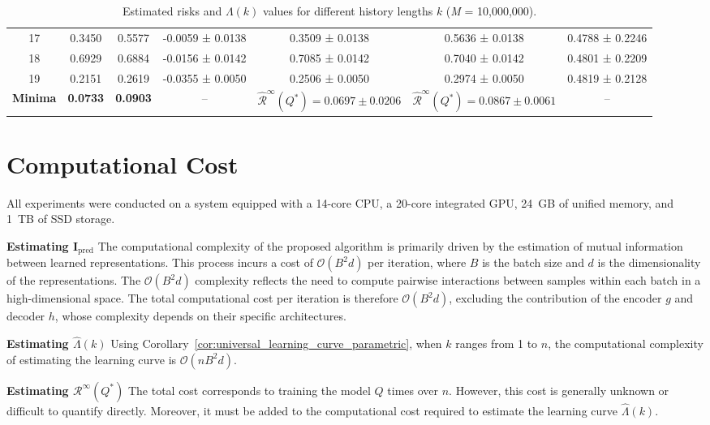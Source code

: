 \documentclass{article}
\begin{document}
\begin{table}[H]
{\begin{tabular}{c c c c c c c}
17 & 0.3450 & 0.5577 & -0.0059 ± 0.0138 & 0.3509 ± 0.0138 & 0.5636 ± 0.0138 & 0.4788 ± 0.2246 \\
18 & 0.6929 & 0.6884 & -0.0156 ± 0.0142 & 0.7085 ± 0.0142 & 0.7040 ± 0.0142 & 0.4801 ± 0.2209 \\
19 & 0.2151 & 0.2619 & -0.0355 ± 0.0050 & 0.2506 ± 0.0050 & 0.2974 ± 0.0050 & 0.4819 ± 0.2128 \\
\midrule
\multicolumn{1}{r}{\textbf{Minima}} &
\textbf{0.0733} &
\textbf{0.0903} &
-- &
$\hat{\mathcal{R}}^\infty(Q^*) = 0.0697 \pm 0.0206$ &
$\hat{\mathcal{R}}^\infty(Q^*) = 0.0867 \pm 0.0061$ &
-- \\
\bottomrule
\end{tabular}
}
\caption{Estimated risks and $\Lambda(k)$ values for different history lengths $k$ (\textit{M} = 10,000,000).}
\label{tab:universal_learning_4}
\end{table}





\section{Computational Cost}
\label{sec:cost}
All experiments were conducted on a system equipped with a 14-core CPU, a 20-core integrated GPU, 24~GB of unified memory, and 1~TB of SSD storage. 

\textbf{Estimating $\mathbf{I}_{\text{pred}}$} The computational complexity of the proposed algorithm is primarily driven by the estimation of mutual information between learned representations. This process incurs a cost of $\mathcal{O}(B^2 d)$ per iteration, where $B$ is the batch size and $d$ is the dimensionality of the representations. The $\mathcal{O}(B^2 d)$ complexity reflects the need to compute pairwise interactions between samples within each batch in a high-dimensional space. The total computational cost per iteration is therefore $\mathcal{O}(B^2 d)$, excluding the contribution of the encoder $g$ and decoder $h$, whose complexity depends on their specific architectures.

\textbf{Estimating $\hat{\Lambda}(k)$} Using Corollary~\ref{cor:universal_learning_curve_parametric}, when \( k \) ranges from 1 to \( n \), the computational complexity of estimating the learning curve is \( \mathcal{O}(n B^2 d) \).

\textbf{Estimating $\mathcal{R}^{\infty}(Q^*)$} The total cost corresponds to training the model \( Q \) times over \( n \). However, this cost is generally unknown or difficult to quantify directly. Moreover, it must be added to the computational cost required to estimate the learning curve \( \hat{\Lambda}(k) \).
\end{document}
